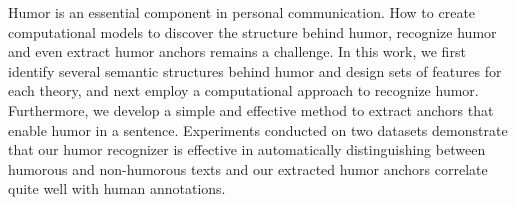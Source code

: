 Humor is an essential component in personal communication. How to create computational models to discover the structure behind humor, recognize humor and even extract humor anchors remains a challenge. In this work, we first identify several semantic structures behind humor and design sets of features for each theory, and next employ a computational approach to recognize humor. Furthermore, we develop a simple and effective method to extract anchors that enable humor in a sentence. Experiments conducted on two datasets demonstrate that our humor recognizer is effective in automatically distinguishing between humorous and non-humorous texts and our extracted humor anchors correlate quite well with human annotations.
